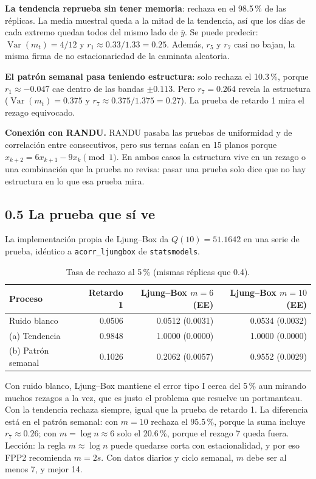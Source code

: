 \documentclass[11pt,letterpaper]{article}
\begin{document}
\textbf{La tendencia reprueba sin tener memoria}: rechaza en el 98.5\,\% de las réplicas. La media muestral queda a la mitad de la tendencia, así que los días de cada extremo quedan todos del mismo lado de $\bar y$. Se puede predecir: $\operatorname{Var}(m_t)=4/12$ y $r_1\approx 0.33/1.33=0.25$. Además, $r_5$ y $r_7$ casi no bajan, la misma firma de no estacionariedad de la caminata aleatoria.

\textbf{El patrón semanal pasa teniendo estructura}: solo rechaza el 10.3\,\%, porque $r_1\approx-0.047$ cae dentro de las bandas $\pm0.113$. Pero $r_7=0.264$ revela la estructura ($\operatorname{Var}(m_t)=0.375$ y $r_7\approx0.375/1.375=0.27$). La prueba de retardo 1 mira el rezago equivocado.

\textbf{Conexión con RANDU.} RANDU pasaba las pruebas de uniformidad y de correlación entre consecutivos, pero sus ternas caían en 15 planos porque $x_{k+2}=6x_{k+1}-9x_k \pmod 1$. En ambos casos la estructura vive en un rezago o una combinación que la prueba no revisa: pasar una prueba solo dice que no hay estructura en lo que esa prueba mira.

\subsection*{0.5 La prueba que sí ve}

La implementación propia de Ljung--Box da $Q(10)=51.1642$ en una serie de prueba, idéntico a \texttt{acorr\_ljungbox} de \texttt{statsmodels}.

\begin{table}[H]
\centering
\caption{Tasa de rechazo al 5\,\% (mismas réplicas que 0.4).}
\small
\begin{tabular}{lrrr}
\toprule
Proceso & Retardo 1 & Ljung--Box $m=6$ (EE) & Ljung--Box $m=10$ (EE)\\
\midrule
Ruido blanco & 0.0506 & 0.0512 (0.0031) & 0.0534 (0.0032)\\
(a) Tendencia & 0.9848 & 1.0000 (0.0000) & 1.0000 (0.0000)\\
(b) Patrón semanal & 0.1026 & 0.2062 (0.0057) & 0.9552 (0.0029)\\
\bottomrule
\end{tabular}
\end{table}

Con ruido blanco, Ljung--Box mantiene el error tipo I cerca del 5\,\% aun mirando muchos rezagos a la vez, que es justo el problema que resuelve un portmanteau. Con la tendencia rechaza siempre, igual que la prueba de retardo 1. La diferencia está en el patrón semanal: con $m=10$ rechaza el 95.5\,\%, porque la suma incluye $r_7\approx0.26$; con $m=\log n\approx6$ solo el 20.6\,\%, porque el rezago 7 queda fuera. Lección: la regla $m\approx\log n$ puede quedarse corta con estacionalidad, y por eso FPP2 recomienda $m=2s$. Con datos diarios y ciclo semanal, $m$ debe ser al menos 7, y mejor 14.
\end{document}

